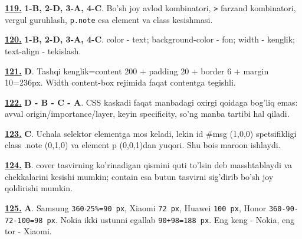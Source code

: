 \documentclass[10pt,a4paper,oneside]{article}
\begin{document}
\par\vspace{3mm}
\noindent\hyperlink{q119}{\textbf{119.}} \textbf{1-B, 2-D, 3-A, 4-C}.  Bo'sh joy avlod kombinatori, \texttt{\textgreater{}} farzand kombinatori, vergul guruhlash, \texttt{p.note} esa element va class kesishmasi.
\par\vspace{3mm}
\noindent\hyperlink{q120}{\textbf{120.}} \textbf{1-B, 2-D, 3-A, 4-C}.  color - text; background-color - fon; width - kenglik; text-align - tekislash.
\par\vspace{3mm}
\noindent\hyperlink{q121}{\textbf{121.}} \textbf{D}.  Tashqi kenglik=content 200 + padding 20 + border 6 + margin 10=236px. Width content-box rejimida faqat contentga tegishli.
\par\vspace{3mm}
\noindent\hyperlink{q122}{\textbf{122.}} \textbf{D - B - C - A}.  CSS kaskadi faqat manbadagi oxirgi qoidaga bog'liq emas: avval origin/importance/layer, keyin specificity, so'ng manba tartibi hal qiladi.
\par\vspace{3mm}
\noindent\hyperlink{q123}{\textbf{123.}} \textbf{C}.  Uchala selektor elementga mos keladi, lekin id \#msg (1,0,0) spetsifikligi class .note (0,1,0) va element p (0,0,1)dan yuqori. Shu bois maroon ishlaydi.
\par\vspace{3mm}
\noindent\hyperlink{q124}{\textbf{124.}} \textbf{B}.  cover tasvirning ko'rinadigan qismini quti to'lsin deb masshtablaydi va chekkalarini kesishi mumkin; contain esa butun tasvirni sig'dirib bo'sh joy qoldirishi mumkin.
\par\vspace{3mm}
\noindent\hyperlink{q125}{\textbf{125.}} \textbf{A}.  Samsung \texttt{360\(\cdot\)25\%=90 px}, Xiaomi \texttt{72 px}, Huawei \texttt{100 px}, Honor \texttt{360-90-72-100=98 px}. Nokia ikki ustunni egallab \texttt{90+98=188 px}. Eng keng - Nokia, eng tor - Xiaomi.
\par\vspace{3mm}
\end{document}
